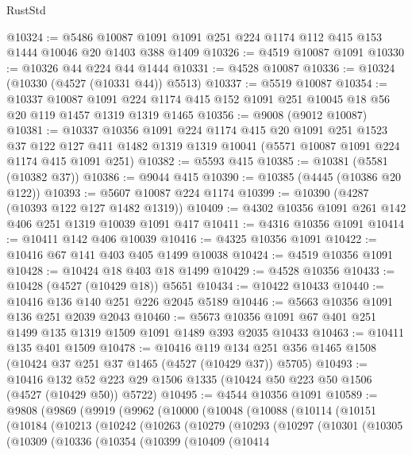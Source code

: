 \begin{lexlean}{RustStd}
\begin{coremodule}
{\begin{coremodule}
{{{{{{{{{{{{{{{{{{{{{{{{{{{{{{{{{{{{{{@10324 := @5486 @10087 @1091 @1091 @251 @224 @1174 @112 @415 @153 @1444 @10046 @20 @1403 @388 @1409
@10326 := @4519 @10087 @1091
@10330 := @10326 @44 @224 @44 @1444
@10331 := @4528 @10087
@10336 := @10324 (@10330 (@4527 (@10331 @44)) @5513)
@10337 := @5519 @10087
@10354 := @10337
    @10087
    @1091
    @224
    @1174
    @415
    @152
    @1091
    @251
    @10045
    @18
    @56
    @20
    @119
    @1457
    @1319
    @1319
    @1465
@10356 := @9008 (@9012 @10087)
@10381 := @10337
    @10356
    @1091
    @224
    @1174
    @415
    @20
    @1091
    @251
    @1523
    @37
    @122
    @127
    @411
    @1482
    @1319
    @1319
    @10041
    (@5571 @10087 @1091 @224 @1174 @415 @1091 @251)
@10382 := @5593 @415
@10385 := @10381 (@5581 (@10382 @37))
@10386 := @9044 @415
@10390 := @10385 (@4445 (@10386 @20 @122))
@10393 := @5607 @10087 @224 @1174
@10399 := @10390 (@4287 (@10393 @122 @127 @1482 @1319))
@10409 := @4302 @10356 @1091 @261 @142 @406 @251 @1319 @10039 @1091 @417
@10411 := @4316 @10356 @1091
@10414 := @10411 @142 @406 @10039
@10416 := @4325 @10356 @1091
@10422 := @10416 @67 @141 @403 @405 @1499 @10038
@10424 := @4519 @10356 @1091
@10428 := @10424 @18 @403 @18 @1499
@10429 := @4528 @10356
@10433 := @10428 (@4527 (@10429 @18)) @5651
@10434 := @10422 @10433
@10440 := @10416 @136 @140 @251 @226 @2045 @5189
@10446 := @5663 @10356 @1091 @136 @251 @2039 @2043
@10460 := @5673 @10356 @1091 @67 @401 @251 @1499 @135 @1319 @1509 @1091 @1489 @393 @2035 @10433
@10463 := @10411 @135 @401 @1509
@10478 := @10416
    @119
    @134
    @251
    @356
    @1465
    @1508
    (@10424 @37 @251 @37 @1465 (@4527 (@10429 @37)) @5705)
@10493 := @10416
    @132
    @52
    @223
    @29
    @1506
    @1335
    (@10424 @50 @223 @50 @1506 (@4527 (@10429 @50)) @5722)
@10495 := @4544 @10356 @1091
@10589 := @9808
    (@9869
      (@9919
        (@9962
          (@10000
            (@10048
              (@10088
                (@10114
                  (@10151
                    (@10184
                      (@10213
                        (@10242
                          (@10263
                            (@10279
                              (@10293
                                (@10297
                                  (@10301
                                    (@10305
                                      (@10309
                                        (@10336
                                          (@10354
                                            (@10399
                                              (@10409
                                                (@10414
}}}}}}}}}}}}}}}}}}}}}}}}}}}}}}}}}}}}}}
\end{coremodule}}
\end{coremodule}
\end{lexlean}
